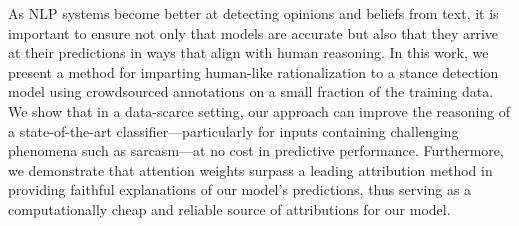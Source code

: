 As {NLP} systems become better at detecting opinions and beliefs from text, it is important to ensure not only that models are accurate but also that they arrive at their predictions in ways that align with human reasoning. In this work, we present a method for imparting human-like rationalization to a stance detection model using crowdsourced annotations on a small fraction of the training data. We show that in a data-scarce setting, our approach can improve the reasoning of a state-of-the-art classifier---particularly for inputs containing challenging phenomena such as sarcasm---at no cost in predictive performance. Furthermore, we demonstrate that attention weights surpass a leading attribution method in providing faithful explanations of our model's predictions, thus serving as a computationally cheap and reliable source of attributions for our model.
